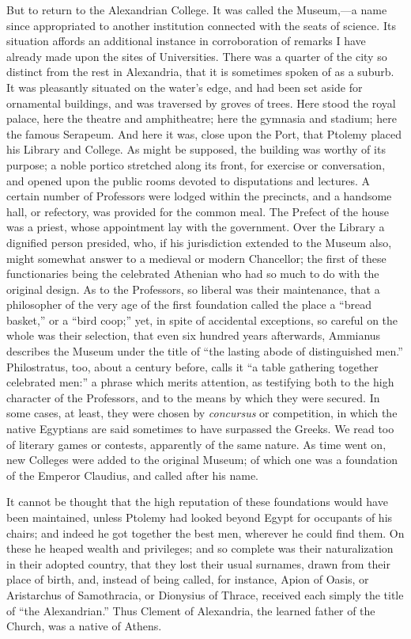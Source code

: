 But to return to the Alexandrian College. It was called the Museum,—a
name since appropriated to another institution connected with the
seats of science. Its situation affords an additional instance in
corroboration of remarks I have already made upon the sites of
Universities. There was a quarter of the city so distinct from the
rest in Alexandria, that it is sometimes spoken of as a suburb. It was
pleasantly situated on the water's edge, and had been set aside for
ornamental buildings, and was traversed by groves of trees. Here stood
the royal palace, here the theatre and amphitheatre; here the gymnasia
and stadium; here the famous Serapeum. And here it was, close
upon the Port, that Ptolemy placed his Library and College. As might
be supposed, the building was worthy of its purpose; a noble portico
stretched along its front, for exercise or conversation, and opened
upon the public rooms devoted to disputations and lectures. A certain
number of Professors were lodged within the precincts, and a handsome
hall, or refectory, was provided for the common meal. The Prefect of
the house was a priest, whose appointment lay with the government.
Over the Library a dignified person presided, who, if his jurisdiction
extended to the Museum also, might somewhat answer to a medieval or
modern Chancellor; the first of these functionaries being the
celebrated Athenian who had so much to do with the original design. As
to the Professors, so liberal was their maintenance, that a
philosopher of the very age of the first foundation called the place a
``bread basket,'' or a ``bird coop;'' yet, in spite of
accidental exceptions, so careful on the whole was their selection,
that even six hundred years afterwards, Ammianus describes the Museum
under the title of ``the lasting abode of distinguished men.''
Philostratus, too, about a century before, calls it ``a table
gathering together celebrated men:'' a phrase which merits
attention, as testifying both to the high character of the Professors,
and to the means by which they were secured. In some cases, at least,
they were chosen by \emph{concursus} or competition, in which the
native Egyptians are said sometimes to have surpassed the Greeks. We
read too of literary games or contests, apparently of the same nature.
As time went on, new Colleges were added to the original Museum; of
which one was a foundation of the Emperor Claudius, and called after
his name.

It cannot be thought that the high reputation of these foundations would have been maintained, unless Ptolemy had looked
beyond Egypt for occupants of his chairs; and indeed he got together
the best men, wherever he could find them. On these he heaped wealth
and privileges; and so complete was their naturalization in their
adopted country, that they lost their usual surnames, drawn from their
place of birth, and, instead of being called, for instance, Apion of
Oasis, or Aristarchus of Samothracia, or Dionysius of Thrace, received
each simply the title of ``the Alexandrian.'' Thus Clement of
Alexandria, the learned father of the Church, was a native of Athens.

